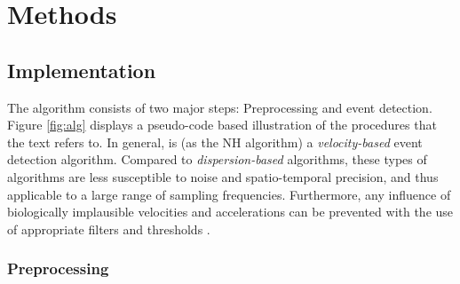 

\section*{Methods}\label{methods}



\subsection*{\remodnav Implementation}\label{impl}


The algorithm consists of two major steps: Preprocessing and event detection.
Figure \ref{fig:alg} displays a pseudo-code based illustration of the
procedures that the text refers to. In general, \remodnav is (as the NH
algorithm) a \textit{velocity-based} event detection algorithm. Compared to
\textit{dispersion-based} algorithms, these types of algorithms are less
susceptible to noise and spatio-temporal precision, and thus applicable to a
large range of sampling frequencies. Furthermore, any influence of biologically
implausible velocities and accelerations can be prevented with the use of
appropriate filters and thresholds \citep{holmqvist2011eye}.

\subsubsection*{Preprocessing}

